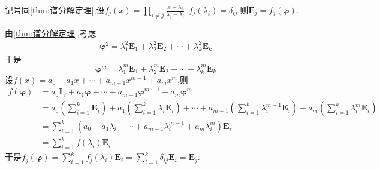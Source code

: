\begin{green}
    \begin{lemma}[正交投影算子的多项式表达]\label{lem:正交投影算子的多项式表达}
        记号同\cref{thm:谱分解定理},设$\displaystyle f_j\left(x\right)=\prod_{i\neq j}\frac{x-\lambda_i}{\lambda_j-\lambda_i}:f_j\left(\lambda_i\right)=\delta_{ij}$,则$\bm{E}_j=f_j\left(\bm{\varphi}\right)$.
    \end{lemma}
    \begin{Proof}
        由\cref{thm:谱分解定理},考虑\begin{align*}
            \bm{\varphi}^2=\lambda_1^2\bm{E}_1+\lambda_2^2\bm{E}_2+\cdots+\lambda_k^2\bm{E}_k
        \end{align*}于是\[
        \bm{\varphi}^m=\lambda_1^m\bm{E}_1+\lambda_2^m\bm{E}_2+\cdots+\lambda_k^m\bm{E}_k
        \]设$f\left(x\right)=a_0+a_1x+\cdots+a_{m-1}x^{m-1}+a_mx^m$,则\begin{align*}
            f\left(\bm{\varphi}\right)&=a_0\bm{I}_V+a_1\bm{\varphi}+\cdots+a_{m-1}\bm{\varphi}^{m-1}+a_m\bm{\varphi}^m\\
            &=a_0\left(
                \sum_{i=1}^{k}\bm{E}_i
            \right)+a_1\left(
                \sum_{i=1}^{k}\lambda_i\bm{E}_i
            \right)+\cdots+a_{m-1}\left(
                \sum_{i=1}^{k}\lambda_i^{m-1}\bm{E}_i
            \right)+a_m\left(
                \sum_{i=1}^{k}\lambda_i^m\bm{E}_i
            \right)\\
            &=\sum_{i=1}^{k}\left(
                a_0+a_1\lambda_i+\cdots+a_{m-1}\lambda_i^{m-1}+a_m\lambda_i^m
            \right)\bm{E}_i\\
            &=\sum_{i=1}^{k}f\left(\lambda_i\right)\bm{E}_i
        \end{align*}于是$\displaystyle f_j\left(\bm{\varphi}\right)=\sum_{i=1}^{k}f_j\left(\lambda_i\right)\bm{E}_i=\sum_{i=1}^{k}\delta_{ij}\bm{E}_i=\bm{E}_j$.
    \end{Proof}
\end{green}
